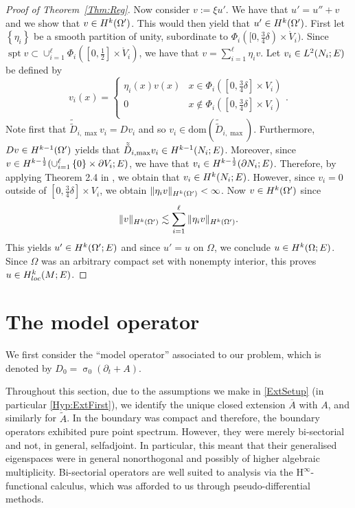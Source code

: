 \documentclass[a4paper,10pt,reqno]{amsart}
\newcommand{\sym}{\upsigma}
\newcommand{\dbrac}[1]{\left\{#1\right\}}
\newcommand{\interior}[1]{\mathring{#1}}
\newcommand{\dtilde}[1]{\tilde{\tilde{#1}}}%
\newcommand{\norm}[1]{\| #1 \|}%
\newcommand{\set}[1]{\dbrac{#1}}
\newcommand{\Lp}[2][{}]{{\rm L}^{#2}_{\rm #1}}%
\newcommand{\Hard}[2][{}]{{\rm H}^{#2}_{\rm #1}}%
\newcommand{\SobH}[2][{}]{\Hard[#1]{\rm #2}}
\newcommand{\dom}{\mathrm{dom}}
\newcommand{\close}[1]{\overline{#1}}
\newcommand{\union}{\cup}
\DeclareMathOperator{\spt}{spt}%
\newcommand{\Hinfty}{$\mathrm{H}^\infty$}
\theoremstyle{definition}
\begin{document}
\begin{proof}[Proof of Theorem~\ref{Thm:Reg}]
Now consider $v := \xi u'$.
We have that $u' = u'' + v$ and we show that $v \in \SobH{k}(\Omega')$.
This would then yield that $u' \in \SobH{k}(\Omega')$.
First let $\set{\eta_i}$ be a smooth partition of unity, subordinate to $\Phi_i([0, \frac34 \delta) \times \interior{V}_i)$.
Since $\spt v \subset \union_{i=1}^\ell \Phi_i( [0,\frac12] \times \interior{V}_i)$, we have that $v = \sum_{i=1}^\ell \eta_i v$.
Let $v_i \in \Lp{2}(N_i;E)$ be defined by
$$ v_i(x) = \begin{cases} \eta_i(x) v(x) & x \in \Phi_i( [0,\frac34 \delta ] \times V_i)     \\
              0              & x \not\in \Phi_i([0, \frac34 \delta] \times  V_i) \\
\end{cases}.$$
Note first that $\dtilde{D}_{i, \max}v_i = Dv_i$ and so  $v_i \in \dom(\dtilde{D}_{i, \max})$.
Furthermore, $Dv \in \SobH{k-1}(\Omega')$ yields that $\dtilde{D}_{i,\max}v_i \in \SobH{k-1}(N_i;E)$.
Moreover, since $v \in \SobH{k-\frac12}(\union_{i=1}^\ell \set{0} \times \partial V_i;E)$, we have that $v_i \in \SobH{k-\frac12 }(\partial N_i;E)$.
Therefore, by applying Theorem 2.4 in \cite{BBan},  we obtain that $v_i \in \SobH{k}(N_i;E)$.
However, since $v_i = 0$ outside of $[0,\frac34 \delta] \times V_i$, we obtain $\norm{\eta_i v}_{\SobH{k}(\Omega')} < \infty$.
Now $v \in \SobH{k}(\Omega')$ since
$$\norm{v}_{\SobH{k}(\Omega')} \lesssim \sum_{i=1}^\ell \norm{\eta_i v}_{\SobH{k}(\Omega')}.$$
This yields $u' \in \SobH{k}(\Omega';E)$ and since $u' = u$ on $\Omega$, we conclude $u \in \SobH{k}(\Omega;E)$.
Since $\Omega$ was an arbitrary compact set with nonempty interior, this proves $u \in\SobH[loc]{k}(M;E)$.
\end{proof}


\section{The model operator}

We first consider the ``model operator'' associated to our problem, which is denoted by $D_0 = \sym_0(\partial_t + A)$.

Throughout this section, due to the assumptions we make in \ref{ExtSetup} (in particular \ref{Hyp:ExtFirst}), we identify the unique closed extension $\close{A}$ with $A$, and similarly for $\tilde{A}$.
In \cite{BBan} the boundary was compact and therefore, the boundary operators exhibited pure point spectrum.
However, they were merely  bi-sectorial and not, in general, selfadjoint.
In particular, this meant that their generalised eigenspaces were in general nonorthogonal and possibly of higher algebraic multiplicity.
Bi-sectorial operators are well suited to analysis via the \Hinfty-functional calculus, which was afforded to us through pseudo-differential methods.
\end{document}
